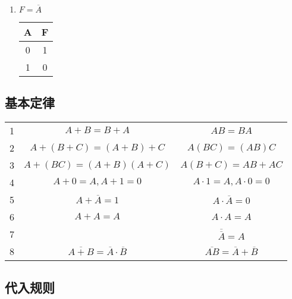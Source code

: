 \begin{enumerate}
    \item $F=\overline A$

          \begin{table}[!htbp]
              \begin{tabular}{|c|c|}
                  \hline
                  A & F \\
                  \hline
                  0 & 1 \\
                  \hline
                  1 & 0 \\
                  \hline
              \end{tabular}
          \end{table}

\end{enumerate}

\newpage

\subsection{基本定律}

\begin{table}[!htbp]
    \centering
    \begin{tabular}{c|c|c}
        \toprule
        1 & $A+B=B+A$                                      & $AB=BA$                                 \\
        2 & $A+(B+C)=(A+B)+C$                              & $A(BC)=(AB)C$                           \\
        3 & $A+(BC)=(A+B)(A+C)$                            & $A(B+C)=AB+AC$                          \\
        4 & $A+0=A , A+1=0$                                & $A \cdot 1=A , A \cdot 0=0$             \\
        5 & $A+\overline A =1$                             & $A \cdot \overline A  =0$               \\
        6 & $A+A=A$                                        & $A \cdot A=A$                           \\
        7 &                                                & $\overline{\overline A}=A$              \\
        8 & $\overline{A+B}=\overline A \cdot \overline B$ & $\overline{AB}=\overline A+\overline B$ \\
        \bottomrule
    \end{tabular}
\end{table}

\subsection{代入规则}

